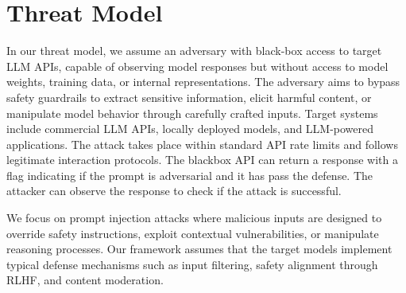 \section{Threat Model}

In our threat model, we assume an adversary with black-box access to target LLM APIs, capable of observing model responses but without access to model weights, training data, or internal representations. The adversary aims to bypass safety guardrails to extract sensitive information, elicit harmful content, or manipulate model behavior through carefully crafted inputs. Target systems include commercial LLM APIs, locally deployed models, and LLM-powered applications. The attack takes place within standard API rate limits and follows legitimate interaction protocols. The blackbox API can return a response with a flag indicating if the prompt is adversarial and it has pass the defense. The attacker can observe the response to check if the attack is successful.

We focus on prompt injection attacks where malicious inputs are designed to override safety instructions, exploit contextual vulnerabilities, or manipulate reasoning processes. Our framework assumes that the target models implement typical defense mechanisms such as input filtering, safety alignment through RLHF, and content moderation.
